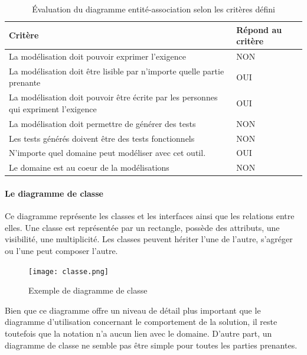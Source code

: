         \begin{table}[H]
        \centering
             \begin{tabular}{|p{25em}|p{5em}|} 
             \hline
            Critère & Répond au critère \\ [0.5ex] 
             \hline
             La modélisation doit pouvoir exprimer l’exigence & \cellcolor[HTML]{D03737}NON\\
             \hline
            La modélisation doit être lisible par n’importe quelle partie prenante & \cellcolor[HTML]{699A73}OUI\\
             \hline
            La modélisation doit pouvoir être écrite par les personnes qui expriment l’exigence &\cellcolor[HTML]{699A73} OUI \\
             \hline
            La modélisation doit permettre de générer des tests & \cellcolor[HTML]{D03737}NON \\
             \hline
            Les tests générés doivent être des tests fonctionnels &\cellcolor[HTML]{D03737} NON\\ 
             \hline
            N’importe quel domaine peut modéliser avec cet outil.&\cellcolor[HTML]{699A73} OUI\\ 
             \hline
            Le domaine est au coeur de la modélisations &\cellcolor[HTML]{D03737} NON\\ 
            \hline 
            \end{tabular}
            \caption{Évaluation du diagramme entité-association selon les critères défini}
            \end{table}

        \paragraph{Le diagramme de classe}
        
        Ce diagramme représente les classes et les interfaces ainsi que les relations entre elles. Une classe est représentée par un rectangle, possède des attributs, une visibilité, une multiplicité. Les classes peuvent hériter l'une de l'autre, s'agréger ou l'une peut composer l'autre.
    
        \begin{figure}[H]
            \centering
            \texttt{[image: classe.png]}
            \caption{Exemple de diagramme de classe}
        \end{figure}

        Bien que ce diagramme offre un niveau de détail plus important que le diagramme d'utilisation concernant le comportement de la solution, il reste toutefois que la notation n'a aucun lien avec le domaine. D'autre part, un diagramme de classe ne semble pas être simple pour toutes les parties prenantes. 

